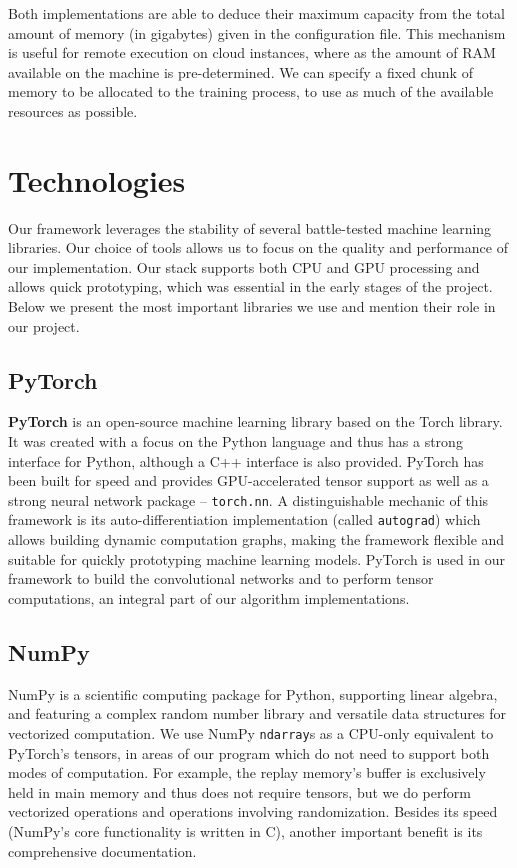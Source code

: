 Both implementations are able to deduce their maximum capacity from the total amount of memory (in gigabytes) given in the configuration file.
This mechanism is useful for remote execution on cloud instances, where as the amount of RAM available on the machine is pre-determined. We can specify a fixed chunk of memory to be allocated to the training process, to use as much of the available resources as possible.

\clearpage

\section{Technologies} \label{section:technologies}
Our framework leverages the stability of several battle-tested machine learning libraries.
Our choice of tools allows us to focus on the quality and performance of our implementation.
Our stack supports both CPU and GPU processing and allows quick prototyping, which was essential in the early stages of the project.
Below we present the most important libraries we use and mention their role in our project.

\subsection*{PyTorch}
\textbf{PyTorch} is an open-source machine learning library based on the Torch library.
It was created with a focus on the Python language \cite{pytorch-book} and thus has a strong interface for Python, although a C++ interface is also provided.
PyTorch has been built for speed and provides GPU-accelerated tensor support as well as a strong neural network package -- \verb|torch.nn|.
A distinguishable mechanic of this framework is its auto-differentiation implementation (called \texttt{autograd}) which allows building dynamic computation graphs, making the framework flexible and suitable for quickly prototyping machine learning models.
PyTorch is used in our framework to build the convolutional networks and to perform tensor computations, an integral part of our algorithm implementations.

\subsection*{NumPy}
NumPy is a scientific computing package for Python, supporting linear algebra, and featuring a complex random number library and versatile data structures for vectorized computation.
We use NumPy \verb|ndarray|s as a CPU-only equivalent to PyTorch's tensors, in areas of our program which do not need to support both modes of computation.
For example, the replay memory's buffer is exclusively held in main memory and thus does not require tensors, but we do perform vectorized operations and operations involving randomization.
Besides its speed (NumPy's core functionality is written in C), another important benefit is its comprehensive documentation.

